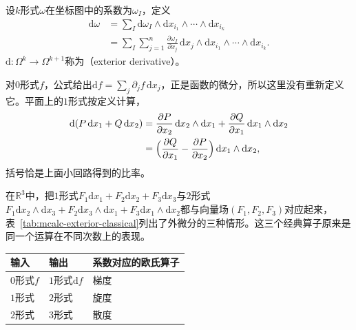 \begin{definition}[外微分]
\label{def:mcalc-exterior-derivative}
设$k$形式$\omega$在坐标图中的系数为$\omega_I$，定义
\begin{equation}
\begin{aligned}
\mathrm d\omega&=\sum_I\mathrm d\omega_I\wedge\mathrm dx_{i_1}\wedge\cdots\wedge\mathrm dx_{i_k}\\
&=\sum_I\sum_{j=1}^n\frac{\partial\omega_I}{\partial x_j}\,\mathrm dx_j\wedge\mathrm dx_{i_1}\wedge\cdots\wedge\mathrm dx_{i_k}.
\end{aligned}
\label{eq:mcalc-exterior-derivative}
\end{equation}
$\mathrm d:\Omega^k\to\Omega^{k+1}$称为（exterior derivative）。
\end{definition}

对$0$形式$f$，公式给出$\mathrm df=\sum_j\partial_jf\,\mathrm dx_j$，正是函数的微分，所以这里没有重新定义它。平面上的$1$形式按定义计算，
\[
\begin{aligned}
\mathrm d(P\,\mathrm dx_1+Q\,\mathrm dx_2)
&=\frac{\partial P}{\partial x_2}\,\mathrm dx_2\wedge\mathrm dx_1+\frac{\partial Q}{\partial x_1}\,\mathrm dx_1\wedge\mathrm dx_2\\
&=\Bigl(\frac{\partial Q}{\partial x_1}-\frac{\partial P}{\partial x_2}\Bigr)\,\mathrm dx_1\wedge\mathrm dx_2 ,
\end{aligned}
\]
括号恰是上面小回路得到的比率。

在$\mathbb R^3$中，把$1$形式$F_1\mathrm dx_1+F_2\mathrm dx_2+F_3\mathrm dx_3$与$2$形式$F_1\mathrm dx_2\wedge\mathrm dx_3+F_2\mathrm dx_3\wedge\mathrm dx_1+F_3\mathrm dx_1\wedge\mathrm dx_2$都与向量场$(F_1,F_2,F_3)$对应起来，表~\ref{tab:mcalc-exterior-classical}列出了外微分的三种情形。这三个经典算子原来是同一个运算在不同次数上的表现。

\begin{BookInlineTable}
  \centering
  \begin{tabular}{lll}
    \toprule
    输入 & 输出 & 系数对应的欧氏算子\\
    \midrule
    $0$形式$f$ & $1$形式$\mathrm df$ & 梯度\\
    $1$形式 & $2$形式 & 旋度\\
    $2$形式 & $3$形式 & 散度\\
    \bottomrule
  \end{tabular}
  \caption{$\mathbb R^3$中外微分与欧氏算子的对应。对应只在标准内积与标准定向下成立，第~\ref{sec:mcalc-operators}节在一般度量下分别定义这些算子。}
  \label{tab:mcalc-exterior-classical}
\end{BookInlineTable}

